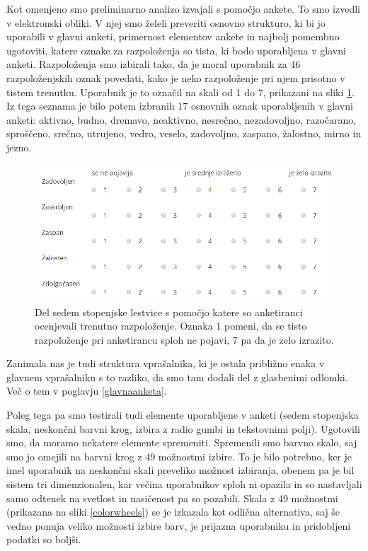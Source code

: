 \documentclass[a4paper, 12pt]{book}
\begin{document}
{Kot omenjeno smo preliminarno analizo izvajali s pomočjo ankete. To smo izvedli v elektronski obliki. V njej smo želeli preveriti osnovno strukturo, ki bi jo uporabili v glavni anketi, primernost elementov ankete in najbolj pomembno ugotoviti, katere oznake za razpoloženja so tista, ki bodo uporabljena v glavni anketi. Razpoloženja smo izbirali tako, da je moral uporabnik za 46 razpoloženjskih oznak povedati, kako je neko razpoloženje pri njem prisotno v tistem trenutku. Uporabnik je to označil na skali od 1 do 7, prikazani na sliki \ref{skala}. Iz tega seznama je bilo potem izbranih 17 osnovnih oznak uporabljenih v glavni anketi: aktivno, budno, dremavo, neaktivno, nesrečno, nezadovoljno, razočarano, sproščeno, srečno, utrujeno, vedro, veselo, zadovoljno, zaspano, žalostno, mirno in jezno.

\begin{figure}[ht]
\centering
\includegraphics[width=13cm]{images/likart.png}

\caption{Del sedem stopenjske lestvice s pomočjo katere so anketiranci ocenjevali trenutno razpoloženje. Oznaka 1 pomeni, da se tisto razpoloženje pri anketirancu sploh ne pojavi, 7 pa da je zelo izrazito. }
\label{skala}
\end{figure}

Zanimala nas je tudi struktura vprašalnika, ki je ostala približno enaka v glavnem vprašalniku s to razliko, da smo tam dodali del z glasbenimi odlomki. Več o tem v poglavju \ref{glavnaanketa}.

Poleg tega pa smo testirali tudi elemente uporabljene v anketi (sedem stopenjska skala, neskončni barvni krog, izbira z radio gumbi in tekstovnimi polji). Ugotovili smo, da moramo nekatere elemente spremeniti. Spremenili smo barvno skalo, saj smo jo omejili na barvni krog z 49 možnostmi izbire. To je bilo potrebno, ker je imel uporabnik na neskončni skali preveliko možnost izbiranja, obenem pa je bil sistem tri dimenzionalen, kar večina uporabnikov sploh ni opazila in so nastavljali samo odtenek na svetlost in nasičenost pa so pozabili. Skala z 49 možnostmi (prikazana na sliki \ref{colorwheels}) se je izkazala kot odlična alternativa, saj še vedno ponuja veliko možnosti izbire barv, je prijazna uporabniku in pridobljeni podatki so boljši.

}
\end{document}
